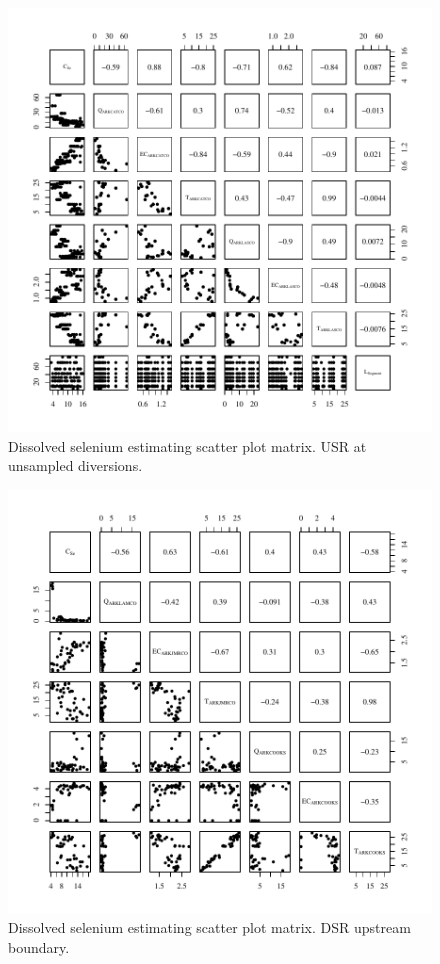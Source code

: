 \begin{figure}[htbp]
	\begin{center}
	\includegraphics[width=6in]{"Figures/Results_USR/Conc Model Full PairsUDIV"}
	\caption{Dissolved selenium estimating scatter plot matrix.  USR at unsampled diversions.}
	\end{center}
\end{figure}

\begin{figure}[htbp]
	\begin{center}
	\includegraphics[width=6in]{"Figures/Results_DSR/Conc Model Full PairsD101C"}
	\caption{Dissolved selenium estimating scatter plot matrix.  DSR upstream boundary.}
	\end{center}
\end{figure}

